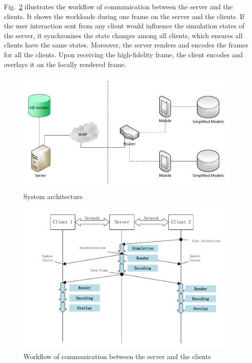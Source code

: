 Fig.~\ref{fig:swf} illustrates the workflow of communication between the server and the clients. It shows the workloads during one frame on the server and the clients. If the user interaction sent from any client would influence the simulation states of the server, it synchronizes the state changes among all clients, which ensures all clients have the same states. Moreover, the server renders and encodes the frames for all the clients. Upon receiving the high-fidelity frame, the client encodes and overlays it on the locally rendered frame.

\begin{figure}[!htbp]
	\centering
	\includegraphics[width=\columnwidth]{figures/architecture.pdf}
	\caption{System architecture}
	\label{fig:architecture}
\end{figure}

\begin{figure}[!htbp]
	\centering
	\includegraphics[width=\columnwidth]{figures/sequence_workflow.pdf}
	\caption{Workflow of communication between the server and the clients}
	\label{fig:swf}
\end{figure}

